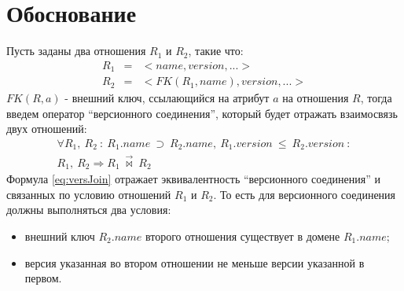 \section{Обоснование}
\indent Пусть заданы два отношения $R_1$ и $R_2$, такие что:
\begin{eqnarray*}
	R_1 & = & <name, version, ...> \\
	R_2 & = & <FK(R_1, name), version, ...>
\end{eqnarray*}
\indent $FK(R, a)$ - внешний ключ, ссылающийся на атрибут $a$ на отношения $R$, тогда введем оператор ``версионного соединения'', который будет отражать взаимосвязь двух отношений:
\begin{multline}
	\label{eq:versJoin}
	\forall R_1,\ R_2\ :\ R_1.name\ \supset\ R_2.name,\ R_1.version\ \leq\ R_2.version\ :\\
	R_1,\ R_2 \Rightarrow R_1\ \overrightarrow{\bowtie}\ R_2\
\end{multline}
\indent Формула \ref{eq:versJoin} отражает эквивалентность ``версионного соединения'' и связанных по условию отношений $R_1$ и $R_2$.
То есть для версионного соединения должны выполняться два условия:
\begin{itemize}
	\item внешний ключ $R_2.name$ второго отношения существует в домене $R_1.name$;
	\item версия указанная во втором отношении не меньше версии указанной в первом.
\end{itemize}


